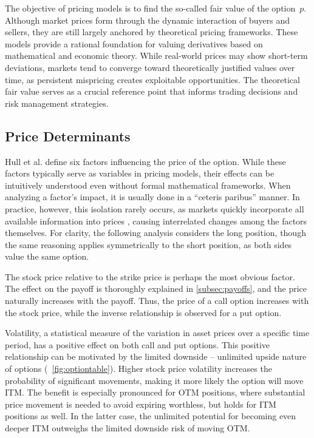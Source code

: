 \documentclass[english,12pt,a4paper,pdftex,sci,utf8]{aaltothesis}
\begin{document}
The objective of pricing models is to find the so-called fair value of the option~$p$. Although market prices form through the dynamic interaction of buyers and sellers, they are still largely anchored by theoretical pricing frameworks. These models provide a rational foundation for valuing derivatives based on mathematical and economic theory. While real-world prices may show short-term deviations, markets tend to converge toward theoretically justified values over time, as persistent mispricing creates exploitable opportunities. The theoretical fair value serves as a crucial reference point that informs trading decisions and risk management strategies.

\subsection{Price Determinants}

Hull et al. \cite{hull2013fundamentals} define six factors influencing the price of the option. While these factors typically serve as variables in pricing models, their effects can be intuitively understood even without formal mathematical frameworks. When analyzing a factor's impact, it is usually done in a ``ceteris paribus'' manner. In practice, however, this isolation rarely occurs, as markets quickly incorporate all available information into prices \cite{fama1970efficient}, causing interrelated changes among the factors themselves. For clarity, the following analysis considers the long position, though the same reasoning applies symmetrically to the short position, as both sides value the same option.

The stock price relative to the strike price is perhaps the most obvious factor. The effect on the payoff is thoroughly explained in \cref{subsec:payoffs}, and the price naturally increases with the payoff. Thus, the price of a call option increases with the stock price, while the inverse relationship is observed for a put option.

Volatility, a statistical measure of the variation in asset prices over a specific time period, has a positive effect on both call and put options. This positive relationship can be motivated by the limited downside -- unlimited upside nature of options (~\ref{fig:optiontable}). Higher stock price volatility increases the probability of significant movements, making it more likely the option will move ITM. The benefit is especially pronounced for OTM positions, where substantial price movement is needed to avoid expiring worthless, but holds for ITM positions as well. In the latter case, the unlimited potential for becoming even deeper ITM outweighs the limited downside risk of moving OTM.
\end{document}
